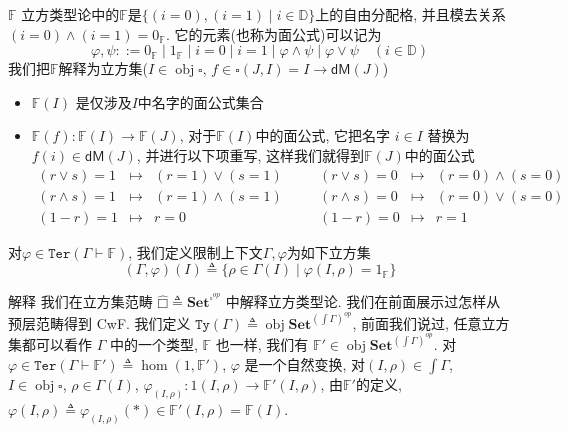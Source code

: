 \documentclass[aspectratio=169,xcolor=dvipsnames]{beamer}
\newcommand\bbD{\mathbb{D}}
\newcommand\bbF{\mathbb{F}}
\newcommand\Ty{\mathtt{Ty}}
\newcommand\Ter{\mathtt{Ter}}
\newcommand\dM{\mathsf{dM}}
\newcommand\Set{\mathbf{Set}}
\DeclareMathOperator\obj{obj}
\begin{document}
\begin{frame}[shrink]{$\bbF$}
  立方类型论中的$\bbF$是$\{(i=0),(i=1)\mid i\in\bbD\}$上的自由分配格, 并且模去关系$(i=0)\land(i=1)=0_{\bbF}$. 它的元素(也称为面公式)可以记为
  \[
  \varphi,\psi ::= 0_{\bbF} \mid 1_{\bbF} \mid i=0 \mid i=1 \mid \varphi\land\psi \mid \varphi\lor\psi \quad(i\in\bbD)
  \]
  我们把$\bbF$解释为立方集($I\in\obj\square$, $f\in\square(J,I)=I\to\dM(J)$)
  \begin{itemize}
    \item $\bbF(I)$ 是仅涉及$I$中名字的面公式集合
    \item $\bbF(f):\bbF(I)\to\bbF(J)$, 对于$\bbF(I)$中的面公式, 它把名字 $i\in I$ 替换为 $f(i)\in\dM(J)$, 并进行以下项重写, 这样我们就得到$\bbF(J)$中的面公式
\[
\begin{array}{rclcrcl}
(r \lor s) = 1 & \mapsto & (r=1) \lor (s=1) & \quad & (r \lor s) = 0 & \mapsto & (r=0) \land (s=0) \\
(r \land s) = 1 & \mapsto & (r=1) \land (s=1) & \quad & (r \land s) = 0 & \mapsto & (r=0) \lor (s=0) \\
(1-r) = 1 & \mapsto & r=0 & \quad & (1-r) = 0 & \mapsto & r=1
\end{array}
\]
  \end{itemize}
  对$\varphi\in\Ter(\Gamma\vdash\bbF)$, 我们定义限制上下文$\Gamma,\varphi$为如下立方集
  \[
  (\Gamma,\varphi)(I)\triangleq\{\rho\in\Gamma(I)\mid\varphi(I,\rho)=1_{\bbF}\}
  \]
\end{frame}

\begin{frame}[shrink]{解释}
  我们在立方集范畴 $\widehat{□}\triangleq\Set^{\square^{op}}$ 中解释立方类型论. 我们在前面展示过怎样从预层范畴得到 CwF. 我们定义 $\Ty(\Gamma)\triangleq\obj\Set^{{(\int\Gamma)}^{op}}$, 前面我们说过, 任意立方集都可以看作 $\Gamma$ 中的一个类型, $\bbF$ 也一样, 我们有 $\bbF'\in\obj\Set^{{(\int\Gamma)}^{op}}$. 对$\varphi\in\Ter(\Gamma\vdash\bbF')\triangleq\hom(1,\bbF')$, $\varphi$ 是一个自然变换, 对$(I,\rho)\in\int\Gamma$, $I\in\obj\square$, $\rho\in\Gamma(I)$, $\varphi_{(I,\rho)}:1(I,\rho)\to\bbF'(I,\rho)$, 由$\bbF'$的定义, $\varphi(I,\rho)\triangleq\varphi_{(I,\rho)}(\ast) \in \bbF'(I,\rho)=\bbF(I)$.
\end{frame}
\end{document}
